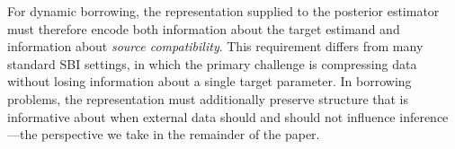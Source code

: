 For dynamic borrowing, the representation supplied to the posterior
estimator must therefore encode both information about the target estimand
and information about \emph{source compatibility}.
This requirement differs from many standard SBI settings, in which the
primary challenge is compressing data without losing information about a
single target parameter.
In borrowing problems, the representation must additionally preserve
structure that is informative about when external data should and should
not influence inference---the perspective we take in the remainder of the
paper.
